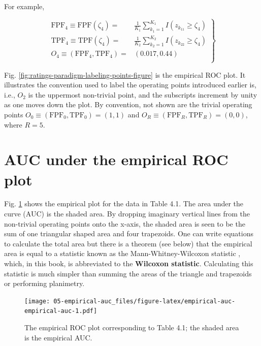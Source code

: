 \documentclass[
]{book}
\begin{document}
For example,

\begin{equation} 
\left.
\begin{aligned}
\text{FPF}_4 \equiv \text{FPF}\left ( \zeta_4 \right )=&\frac {1} {K_1} \sum_{k_1=1}^{K_1}I \left ( z_{k_11} \geq  \zeta_4\right ) \\
\text{TPF}_4 \equiv \text{TPF}\left ( \zeta_4 \right )=&\frac {1} {K_2} \sum_{k_2=1}^{K_2} I\left ( z_{k_22} \geq  \zeta_4\right ) \\
O_4 \equiv \left ( \text{FPF}_4, \text{TPF}_4 \right ) =& \left ( 0.017, 0.44 \right )\\
\end{aligned}
\right \}
\label{eq:empirical-operating-point-fpf-tpf-4}
\end{equation}

Fig. \ref{fig:ratings-paradigm-labeling-points-figure} is the empirical ROC plot. It illustrates the convention used to label the operating points introduced earlier is, i.e., \(O_2\) is the uppermost non-trivial point, and the subscripts increment by unity as one moves down the plot. By convention, not shown are the trivial operating points \(O_0 \equiv (\text{FPF}_0, \text{TPF}_0) = (1,1)\) and \(O_R \equiv (\text{FPF}_R, \text{TPF}_R) = (0,0)\), where \(R = 5\).

\hypertarget{empirical-auc-area-under}{%
\section{AUC under the empirical ROC plot}\label{empirical-auc-area-under}}

Fig. \ref{fig:empirical-auc-empirical-auc} shows the empirical plot for the data in Table 4.1. The area under the curve (AUC) is the shaded area. By dropping imaginary vertical lines from the non-trivial operating points onto the x-axis, the shaded area is seen to be the sum of one triangular shaped area and four trapezoids. One can write equations to calculate the total area but there is a theorem (see below) that the empirical area is equal to a statistic known as the Mann-Whitney-Wilcoxon statistic \citep{RN2191, RN2197}, which, in this book, is abbreviated to the \textbf{Wilcoxon statistic}. Calculating this statistic is much simpler than summing the areas of the triangle and trapezoids or performing planimetry.

\begin{figure}
\centering
\texttt{[image: 05-empirical-auc\_files/figure-latex/empirical-auc-empirical-auc-1.pdf]}
\caption{\label{fig:empirical-auc-empirical-auc}The empirical ROC plot corresponding to Table 4.1; the shaded area is the empirical AUC.}
\end{figure}
\end{document}
